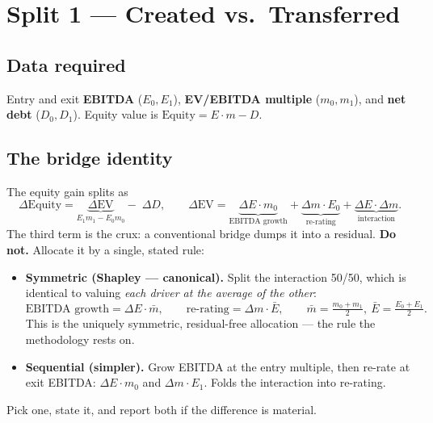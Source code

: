 \documentclass[11pt]{article}
\begin{document}
\section{Split 1 --- Created vs.\ Transferred}

\subsection{Data required}
Entry and exit \textbf{EBITDA} ($E_0,E_1$), \textbf{EV/EBITDA multiple} ($m_0,m_1$), and
\textbf{net debt} ($D_0,D_1$). Equity value is $\text{Equity}=E\cdot m-D$.

\subsection{The bridge identity}
The equity gain splits as
\[
\Delta\text{Equity}=\underbrace{\Delta\text{EV}}_{E_1m_1-E_0m_0}-\;\Delta D,
\qquad
\Delta\text{EV}=\underbrace{\Delta E\cdot m_0}_{\text{EBITDA growth}}
+\underbrace{\Delta m\cdot E_0}_{\text{re-rating}}
+\underbrace{\Delta E\cdot\Delta m}_{\text{interaction}} .
\]
The third term is the crux: a conventional bridge dumps it into a residual. \textbf{Do not.}
Allocate it by a single, stated rule:

\begin{itemize}
  \item \textbf{Symmetric (Shapley --- canonical).} Split the interaction 50/50, which is
  identical to valuing \emph{each driver at the average of the other}:
  \[
  \text{EBITDA growth}=\Delta E\cdot\bar m,\qquad
  \text{re-rating}=\Delta m\cdot \bar E,\qquad
  \bar m=\tfrac{m_0+m_1}{2},\ \bar E=\tfrac{E_0+E_1}{2}.
  \]
  This is the uniquely symmetric, residual-free allocation --- the rule the methodology rests on.
  \item \textbf{Sequential (simpler).} Grow EBITDA at the entry multiple, then re-rate at exit
  EBITDA: $\Delta E\cdot m_0$ and $\Delta m\cdot E_1$. Folds the interaction into re-rating.
\end{itemize}
Pick one, state it, and report both if the difference is material.
\end{document}
